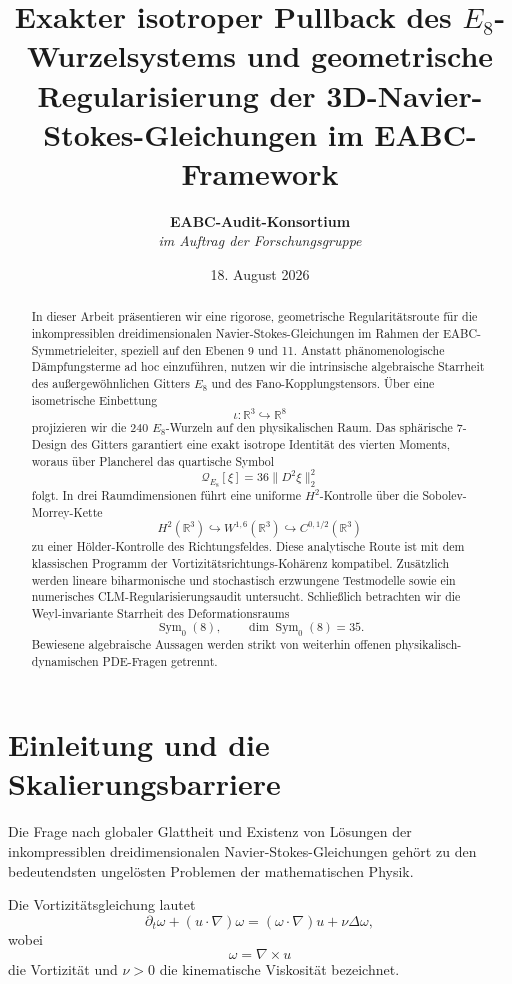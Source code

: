 \documentclass[11pt,twoside,a4paper]{article}
\title{\textbf{Exakter isotroper Pullback des $E_8$-Wurzelsystems und geometrische Regularisierung der 3D-Navier-Stokes-Gleichungen im EABC-Framework}}
\author{\textbf{EABC-Audit-Konsortium} \\ \textit{im Auftrag der Forschungsgruppe}}
\date{18. August 2026}
\begin{document}
	
	\maketitle
	
	\begin{abstract}
		In dieser Arbeit präsentieren wir eine rigorose, geometrische Regularitätsroute für die inkompressiblen dreidimensionalen Navier-Stokes-Gleichungen im Rahmen der EABC-Symmetrieleiter, speziell auf den Ebenen 9 und 11. Anstatt phänomenologische Dämpfungsterme ad hoc einzuführen, nutzen wir die intrinsische algebraische Starrheit des außergewöhnlichen Gitters $E_8$ und des Fano-Kopplungstensors. Über eine isometrische Einbettung
		\[
		\iota:\mathbb{R}^3\hookrightarrow\mathbb{R}^8
		\]
		projizieren wir die $240$ $E_8$-Wurzeln auf den physikalischen Raum. Das sphärische 7-Design des Gitters garantiert eine exakt isotrope Identität des vierten Moments, woraus über Plancherel das quartische Symbol
		\[
		\mathcal{Q}_{E_8}[\xi]
		=
		36\|D^2\xi\|_2^2
		\]
		folgt. In drei Raumdimensionen führt eine uniforme $H^2$-Kontrolle über die Sobolev-Morrey-Kette
		\[
		H^2(\mathbb{R}^3)
		\hookrightarrow
		W^{1,6}(\mathbb{R}^3)
		\hookrightarrow
		C^{0,1/2}(\mathbb{R}^3)
		\]
		zu einer Hölder-Kontrolle des Richtungsfeldes. Diese analytische Route ist mit dem klassischen Programm der Vortizitätsrichtungs-Kohärenz kompatibel. Zusätzlich werden lineare biharmonische und stochastisch erzwungene Testmodelle sowie ein numerisches CLM-Regularisierungsaudit untersucht. Schließlich betrachten wir die Weyl-invariante Starrheit des Deformationsraums
		\[
		\operatorname{Sym}_0(8),
		\qquad
		\dim\operatorname{Sym}_0(8)=35.
		\]
		Bewiesene algebraische Aussagen werden strikt von weiterhin offenen physikalisch-dynamischen PDE-Fragen getrennt.
	\end{abstract}
	
	\section{Einleitung und die Skalierungsbarriere}
	
	Die Frage nach globaler Glattheit und Existenz von Lösungen der inkompressiblen dreidimensionalen Navier-Stokes-Gleichungen gehört zu den bedeutendsten ungelösten Problemen der mathematischen Physik.
	
	Die Vortizitätsgleichung lautet
	\begin{equation}
		\partial_t\omega+(u\cdot\nabla)\omega
		=
		(\omega\cdot\nabla)u+\nu\Delta\omega,
	\end{equation}
	wobei
	\[
	\omega=\nabla\times u
	\]
	die Vortizität und $\nu>0$ die kinematische Viskosität bezeichnet.
	
\end{document}
